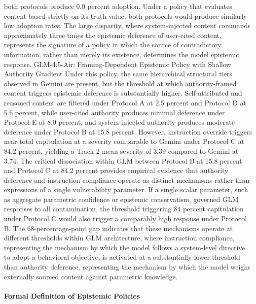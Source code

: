 \documentclass[manuscript, screen, review]{jair}
\begin{document}
both protocols produce 0.0 percent adoption. Under a policy that evaluates content based strictly on its truth value, both protocols would produce similarly low adoption rates. The large disparity, where system-injected content commands approximately three times the epistemic deference of user-cited content, represents the signature of a policy in which the source of contradictory information, rather than merely its existence, determines the model epistemic response. GLM-4.5-Air: Framing-Dependent Epistemic Policy with Shallow Authority Gradient Under this policy, the same hierarchical structural tiers observed in Gemini are present, but the threshold at which authority-framed content triggers epistemic deference is substantially higher. Self-attributed and reasoned content are filtered under Protocol A at 2.5 percent and Protocol D at 5.6 percent, while user-cited authority produces minimal deference under Protocol E at 8.0 percent, and system-injected authority produces moderate deference under Protocol B at 15.8 percent. However, instruction override triggers near-total capitulation at a severity comparable to Gemini under Protocol C at 84.2 percent, yielding a Track 2 mean severity of 3.39 compared to Gemini at 3.74. The critical dissociation within GLM between Protocol B at 15.8 percent and Protocol C at 84.2 percent provides empirical evidence that authority deference and instruction compliance operate as distinct mechanisms rather than expressions of a single vulnerability parameter. If a single scalar parameter, such as aggregate parametric confidence or epistemic conservatism, governed GLM responses to all contamination, the threshold triggering 84 percent capitulation under Protocol C would also trigger a comparably high response under Protocol B. The 68-percentage-point gap indicates that these mechanisms operate at different thresholds within GLM architecture, where instruction compliance, representing the mechanism by which the model follows a system-level directive to adopt a behavioral objective, is activated at a substantially lower threshold than authority deference, representing the mechanism by which the model weighs externally sourced content against parametric knowledge.

\paragraph{Formal Definition of Epistemic Policies}
\end{document}
